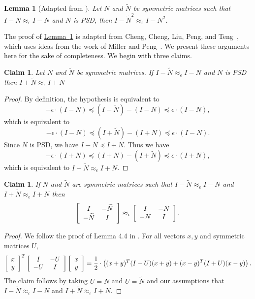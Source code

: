 \documentclass[11pt]{article}
\numberwithin{equation}{section}
\newtheorem{lemma}[theorem]{Lemma}
\newtheorem{claim}[theorem]{Claim}
\theoremstyle{definition}
\theoremstyle{plain}
\newcommand{\expref}[2]{\hyperref[#2]{#1~\ref{#2}}}
\newcommand{\wt}{\widetilde}   %
\numberwithin{myalgctr}{section}
\theoremstyle{named}
\begin{document}
\begin{lemma}[Adapted from \cite{cheng2015}]
\label{lem:sq}
Let $N$ and $\wt{N}$ be symmetric matrices such that $I-\wt{N}\approx_{\epsilon} I-N$ and $N$ is PSD, then $I-\wt{N}^2 \approx_{\epsilon} I-N^2$.
\end{lemma}
The proof of \expref{Lemma}{lem:sq} is adapted from Cheng, Cheng, Liu, Peng, and Teng~\cite{cheng2015}, which uses ideas from the work of Miller and Peng~\cite{miller2013approximate}. We present these arguments here for the sake of completeness. We begin with three claims.
\begin{claim}
\label{claim1}
Let $N$ and $\wt{N}$ be symmetric matrices. If $I-\wt{N}\approx_{\epsilon}I-N$ and $N$ is PSD then $I+\wt{N}\approx_{\epsilon}I+N$
\end{claim}
\begin{proof}
By definition, the hypothesis is equivalent to 
\[
-\epsilon\cdot (I-N)\preceq(I-\wt{N})-(I-N)\preceq \epsilon\cdot(I-N),
\]
which is equivalent to 
\[
-\epsilon\cdot (I-N)\preceq(I+\wt{N})-(I+N)\preceq \epsilon\cdot(I-N).
\]
Since $N$ is PSD, we have $I-N\preceq I+N$. Thus we have
\[
-\epsilon\cdot(I+N)\preceq (I+N)-(I+\wt{N})\preceq\epsilon\cdot (I+N),
\]
which is equivalent to $I+\wt{N}\approx_{\epsilon}I+N$.
\end{proof}
\begin{claim}
\label{claim2}
If $N$ and $\wt{N}$ are symmetric matrices such that $I-\wt{N}\approx_{\epsilon}I-N$ and $I+\wt{N}\approx_{\epsilon}I+N$ then
\[
\left[
\begin{array}{c c}
I & -\wt{N} \\
-\wt{N} & I
\end{array}
\right] \approx_{\epsilon}\left[
\begin{array}{c c}
I & -N \\
-N & I
\end{array}
\right].
\]
\end{claim}
\begin{proof}
We follow the proof of Lemma 4.4 in \cite{cheng2015}. For all vectors $x,y$ and symmetric matrices $U$, 
\[
\left[
\begin{array}{c}
x \\
y
\end{array}\right]^{T}\left[
\begin{array}{c c}
I & -U \\
-U & I
\end{array}
\right]\left[
\begin{array}{c}
x \\
y
\end{array}\right] = \frac{1}{2}\cdot\left((x+y)^{T}(I-U)(x+y) + (x-y)^T(I+U)(x-y) \right).
\]
The claim follows by taking $U=N$ and $U=\wt{N}$ and our assumptions that $I-\wt{N}\approx_{\epsilon}I-N$ and $I+\wt{N}\approx_{\epsilon}I+N$.
\end{proof}
\end{document}
